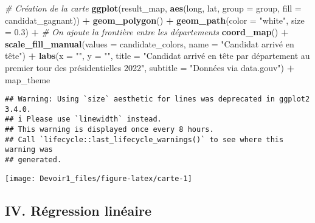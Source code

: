 \documentclass[
]{article}
\newenvironment{Shaded}{\begin{snugshade}}{\end{snugshade}}
\newcommand{\AttributeTok}[1]{\textcolor[rgb]{0.13,0.29,0.53}{#1}}
\newcommand{\CommentTok}[1]{\textcolor[rgb]{0.56,0.35,0.01}{\textit{#1}}}
\newcommand{\FloatTok}[1]{\textcolor[rgb]{0.00,0.00,0.81}{#1}}
\newcommand{\FunctionTok}[1]{\textcolor[rgb]{0.13,0.29,0.53}{\textbf{#1}}}
\newcommand{\NormalTok}[1]{#1}
\newcommand{\SpecialCharTok}[1]{\textcolor[rgb]{0.81,0.36,0.00}{\textbf{#1}}}
\newcommand{\StringTok}[1]{\textcolor[rgb]{0.31,0.60,0.02}{#1}}
\begin{document}
\begin{Shaded}
\begin{Highlighting}[]
\CommentTok{\# Création de la carte}
\FunctionTok{ggplot}\NormalTok{(result\_map, }\FunctionTok{aes}\NormalTok{(long, lat, }\AttributeTok{group =}\NormalTok{ group, }\AttributeTok{fill =}\NormalTok{ candidat\_gagnant)) }\SpecialCharTok{+}
  \FunctionTok{geom\_polygon}\NormalTok{() }\SpecialCharTok{+}
  \FunctionTok{geom\_path}\NormalTok{(}\AttributeTok{color =} \StringTok{"white"}\NormalTok{, }\AttributeTok{size =} \FloatTok{0.3}\NormalTok{) }\SpecialCharTok{+} \CommentTok{\# On ajoute la frontière entre les départements}
  \FunctionTok{coord\_map}\NormalTok{() }\SpecialCharTok{+}
  \FunctionTok{scale\_fill\_manual}\NormalTok{(}\AttributeTok{values =}\NormalTok{ candidate\_colors, }\AttributeTok{name =} \StringTok{"Candidat arrivé en tête"}\NormalTok{) }\SpecialCharTok{+}
  \FunctionTok{labs}\NormalTok{(}\AttributeTok{x =} \StringTok{""}\NormalTok{, }
       \AttributeTok{y =} \StringTok{""}\NormalTok{, }
       \AttributeTok{title =} \StringTok{"Candidat arrivé en tête par département au premier tour des présidentielles 2022"}\NormalTok{, }
       \AttributeTok{subtitle =} \StringTok{"Données via data.gouv"}\NormalTok{) }\SpecialCharTok{+}
\NormalTok{  map\_theme}
\end{Highlighting}
\end{Shaded}

\begin{verbatim}
## Warning: Using `size` aesthetic for lines was deprecated in ggplot2 3.4.0.
## i Please use `linewidth` instead.
## This warning is displayed once every 8 hours.
## Call `lifecycle::last_lifecycle_warnings()` to see where this warning was
## generated.
\end{verbatim}

\begin{center}\texttt{[image: Devoir1\_files/figure-latex/carte-1]} \end{center}

\hypertarget{iv.-ruxe9gression-linuxe9aire}{%
\subsection{IV. Régression
linéaire}\label{iv.-ruxe9gression-linuxe9aire}}
\end{document}
